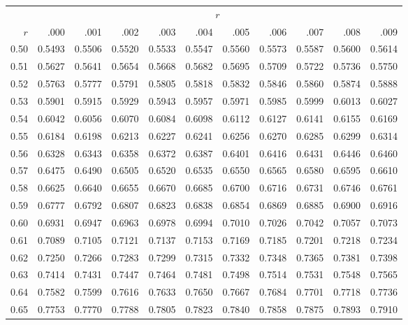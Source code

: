 \begin{center}
	\small
	\setlength{\tabcolsep}{10pt}
	\begin{tabular}{r*{10}{r}}
		& \multicolumn{10}{c}{$r$} \\
		\cline{2-11}
		$r$ & .000 & .001 & .002 & .003 & .004 & .005 & .006 & .007 & .008 & .009 \\
		\midrule
		0.50 & 0.5493 & 0.5506 & 0.5520 & 0.5533 & 0.5547 & 0.5560 & 0.5573 & 0.5587 & 0.5600 & 0.5614 \\
		0.51 & 0.5627 & 0.5641 & 0.5654 & 0.5668 & 0.5682 & 0.5695 & 0.5709 & 0.5722 & 0.5736 & 0.5750 \\
		0.52 & 0.5763 & 0.5777 & 0.5791 & 0.5805 & 0.5818 & 0.5832 & 0.5846 & 0.5860 & 0.5874 & 0.5888 \\
		0.53 & 0.5901 & 0.5915 & 0.5929 & 0.5943 & 0.5957 & 0.5971 & 0.5985 & 0.5999 & 0.6013 & 0.6027 \\
		0.54 & 0.6042 & 0.6056 & 0.6070 & 0.6084 & 0.6098 & 0.6112 & 0.6127 & 0.6141 & 0.6155 & 0.6169 \\
		0.55 & 0.6184 & 0.6198 & 0.6213 & 0.6227 & 0.6241 & 0.6256 & 0.6270 & 0.6285 & 0.6299 & 0.6314 \\
		0.56 & 0.6328 & 0.6343 & 0.6358 & 0.6372 & 0.6387 & 0.6401 & 0.6416 & 0.6431 & 0.6446 & 0.6460 \\
		0.57 & 0.6475 & 0.6490 & 0.6505 & 0.6520 & 0.6535 & 0.6550 & 0.6565 & 0.6580 & 0.6595 & 0.6610 \\
		0.58 & 0.6625 & 0.6640 & 0.6655 & 0.6670 & 0.6685 & 0.6700 & 0.6716 & 0.6731 & 0.6746 & 0.6761 \\
		0.59 & 0.6777 & 0.6792 & 0.6807 & 0.6823 & 0.6838 & 0.6854 & 0.6869 & 0.6885 & 0.6900 & 0.6916 \\[5pt]
		0.60 & 0.6931 & 0.6947 & 0.6963 & 0.6978 & 0.6994 & 0.7010 & 0.7026 & 0.7042 & 0.7057 & 0.7073 \\
		0.61 & 0.7089 & 0.7105 & 0.7121 & 0.7137 & 0.7153 & 0.7169 & 0.7185 & 0.7201 & 0.7218 & 0.7234 \\
		0.62 & 0.7250 & 0.7266 & 0.7283 & 0.7299 & 0.7315 & 0.7332 & 0.7348 & 0.7365 & 0.7381 & 0.7398 \\
		0.63 & 0.7414 & 0.7431 & 0.7447 & 0.7464 & 0.7481 & 0.7498 & 0.7514 & 0.7531 & 0.7548 & 0.7565 \\
		0.64 & 0.7582 & 0.7599 & 0.7616 & 0.7633 & 0.7650 & 0.7667 & 0.7684 & 0.7701 & 0.7718 & 0.7736 \\
		0.65 & 0.7753 & 0.7770 & 0.7788 & 0.7805 & 0.7823 & 0.7840 & 0.7858 & 0.7875 & 0.7893 & 0.7910 \\

\end{tabular}
\end{center}

